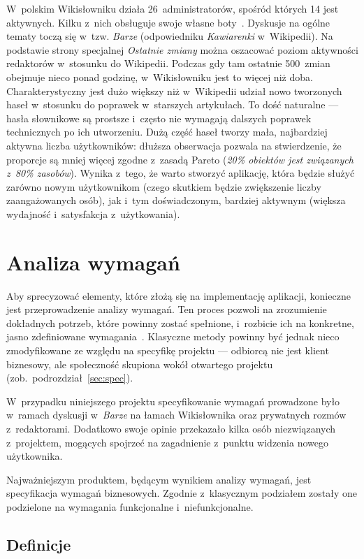 W~polskim Wikisłowniku działa 26~administratorów, spośród których 14 jest aktywnych. Kilku z~nich obsługuje swoje własne boty~\cite{wikt:admin}. Dyskusje na ogólne tematy toczą się w~tzw. \emph{Barze} (odpowiedniku \emph{Kawiarenki} w~Wikipedii). Na podstawie strony specjalnej \emph{Ostatnie zmiany} można oszacować poziom aktywności redaktorów w~stosunku do Wikipedii. Podczas gdy tam ostatnie 500~zmian obejmuje nieco ponad godzinę, w~Wikisłowniku jest to więcej niż doba. Charakterystyczny jest dużo większy niż w~Wikipedii udział nowo tworzonych haseł w~stosunku do poprawek w~starszych artykułach. To dość naturalne --- hasła słownikowe są prostsze i~często nie wymagają dalszych poprawek technicznych po ich utworzeniu. Dużą część haseł tworzy mała, najbardziej aktywna liczba użytkowników: dłuższa obserwacja pozwala na stwierdzenie, że proporcje są mniej więcej zgodne z~zasadą Pareto (\emph{20\% obiektów jest związanych z~80\% zasobów}). Wynika z~tego, że warto stworzyć aplikację, która będzie służyć zarówno nowym użytkownikom (czego skutkiem będzie zwiększenie liczby zaangażowanych osób), jak i~tym doświadczonym, bardziej aktywnym (większa wydajność i~satysfakcja z~użytkowania).


\section{Analiza wymagań}
Aby sprecyzować elementy, które złożą się na implementację aplikacji, konieczne jest przeprowadzenie analizy wymagań. Ten proces pozwoli na zrozumienie dokładnych potrzeb, które powinny zostać spełnione, i~rozbicie ich na konkretne, jasno zdefiniowane wymagania~\cite{guidebook}. Klasyczne metody powinny być jednak nieco zmodyfikowane ze względu na specyfikę projektu --- odbiorcą nie jest klient biznesowy, ale społeczność skupiona wokół otwartego projektu (zob.~podrozdział~\ref{sec:spec}).

W~przypadku niniejszego projektu specyfikowanie wymagań prowadzone było w~ramach dyskusji w~\emph{Barze} na łamach Wikisłownika oraz prywatnych rozmów z~redaktorami. Dodatkowo swoje opinie przekazało kilka osób niezwiązanych z~projektem, mogących spojrzeć na zagadnienie z~punktu widzenia nowego użytkownika.

Najważniejszym produktem, będącym wynikiem analizy wymagań, jest specyfikacja wymagań biznesowych. Zgodnie z~klasycznym podziałem zostały one podzielone na wymagania funkcjonalne i~niefunkcjonalne.

\subsection{Definicje}

